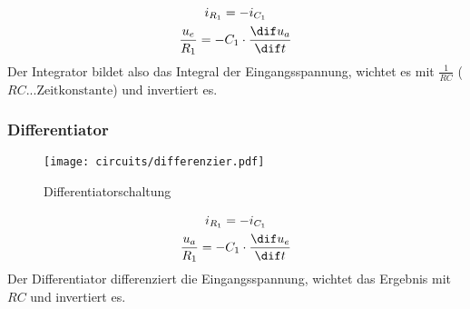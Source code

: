 \begin{gather*}
i_{R_1} = - i_{C_1}\\
\frac{u_e}{R_1} = - C_1 \cdot \frac{\dif u_a}{\dif t}
\end{gather*}
Der Integrator bildet also das Integral der Eingangsspannung, wichtet es mit
$\frac{1}{RC}$ ($RC...\mathrm{Zeitkonstante}$) und invertiert es.

\subsubsection{Differentiator}
\begin{figure}[H]
  \begin{center}
    \texttt{[image: circuits/differenzier.pdf]}
  \end{center}
  \caption{Differentiatorschaltung}
\end{figure}

\begin{gather*}
i_{R_1} = - i_{C_1}\\
\frac{u_a}{R_1} = - C_1 \cdot \frac{\dif u_e}{\dif t}
\end{gather*}
Der Differentiator differenziert die Eingangsspannung, wichtet das Ergebnis mit
$RC$ und invertiert es.
